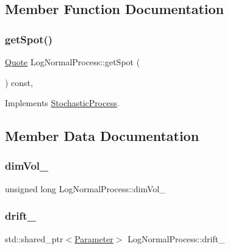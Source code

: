 \subsection{Member Function Documentation}
\hypertarget{class_log_normal_process_a3732c44145aa35d1e2000cc0140bfb03}{}\label{class_log_normal_process_a3732c44145aa35d1e2000cc0140bfb03} 
\subsubsection{\texorpdfstring{get\+Spot()}{getSpot()}}
{\footnotesize\ttfamily \hyperlink{_name_def_8h_a642a6c5fd87319d922637de0e0bb0305}{Quote} Log\+Normal\+Process\+::get\+Spot (\begin{DoxyParamCaption}{ }\end{DoxyParamCaption}) const\hspace{0.3cm}{\ttfamily [override]}, {\ttfamily [virtual]}}



Implements \hyperlink{class_stochastic_process_aad2ef51ca4bc2fe5f33a73e8f0ee361e}{Stochastic\+Process}.



\subsection{Member Data Documentation}
\hypertarget{class_log_normal_process_a2ef2bb09ad7763645dd2d8396355fdb0}{}\label{class_log_normal_process_a2ef2bb09ad7763645dd2d8396355fdb0} 
\subsubsection{\texorpdfstring{dim\+Vol\+\_\+}{dimVol\_}}
{\footnotesize\ttfamily unsigned long Log\+Normal\+Process\+::dim\+Vol\+\_\+\hspace{0.3cm}{\ttfamily [private]}}

\hypertarget{class_log_normal_process_a0d4e011f211503c5bc8482f68e257074}{}\label{class_log_normal_process_a0d4e011f211503c5bc8482f68e257074} 
\subsubsection{\texorpdfstring{drift\+\_\+}{drift\_}}
{\footnotesize\ttfamily std\+::shared\+\_\+ptr$<$\hyperlink{class_parameter}{Parameter}$>$ Log\+Normal\+Process\+::drift\+\_\+\hspace{0.3cm}{\ttfamily [private]}}

